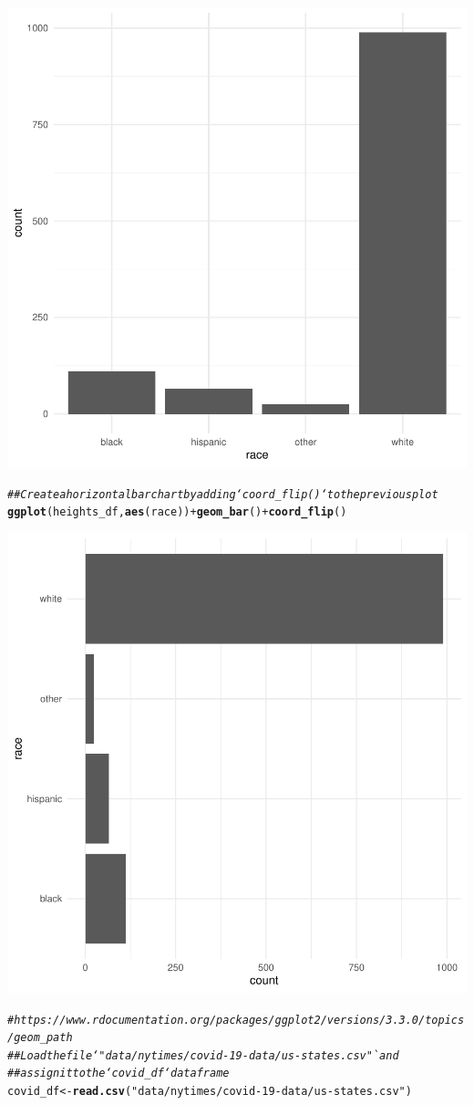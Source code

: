 \documentclass{article}\usepackage[]{graphicx}\usepackage[]{xcolor}
\makeatletter
\newcommand{\hlstr}[1]{\textcolor[rgb]{0.192,0.494,0.8}{#1}}%
\newcommand{\hlcom}[1]{\textcolor[rgb]{0.678,0.584,0.686}{\textit{#1}}}%
\newcommand{\hlopt}[1]{\textcolor[rgb]{0,0,0}{#1}}%
\newcommand{\hlstd}[1]{\textcolor[rgb]{0.345,0.345,0.345}{#1}}%
\newcommand{\hlkwb}[1]{\textcolor[rgb]{0.69,0.353,0.396}{#1}}%
\newcommand{\hlkwd}[1]{\textcolor[rgb]{0.737,0.353,0.396}{\textbf{#1}}}%
\newenvironment{kframe}{%
 \def\at@end@of@kframe{}%
 \ifinner\ifhmode%
  \def\at@end@of@kframe{\end{minipage}}%
  \begin{minipage}{\columnwidth}%
 \fi\fi%
 \def\FrameCommand##1{\hskip\@totalleftmargin \hskip-\fboxsep
 \colorbox{shadecolor}{##1}\hskip-\fboxsep
     \hskip-\linewidth \hskip-\@totalleftmargin \hskip\columnwidth}%
 \MakeFramed {\advance\hsize-\width
   \@totalleftmargin\z@ \linewidth\hsize
   \@setminipage}}%
 {\par\unskip\endMakeFramed%
 \at@end@of@kframe}
\newenvironment{knitrout}{}{} %
\makeatother
\begin{document}
\begin{knitrout}
{\centering \includegraphics[width=.6\linewidth]{figure/assignment-06-ReppetoBrian-Rnwauto-report-4} 

}


\begin{kframe}\begin{alltt}
\hlcom{## Create a horizontal bar chart by adding `coord_flip()` to the previous plot}
\hlkwd{ggplot}\hlstd{(heights_df,} \hlkwd{aes}\hlstd{(race))} \hlopt{+} \hlkwd{geom_bar}\hlstd{()} \hlopt{+} \hlkwd{coord_flip}\hlstd{()}
\end{alltt}
\end{kframe}

{\centering \includegraphics[width=.6\linewidth]{figure/assignment-06-ReppetoBrian-Rnwauto-report-5} 

}


\begin{kframe}\begin{alltt}
\hlcom{# https://www.rdocumentation.org/packages/ggplot2/versions/3.3.0/topics/geom_path}
\hlcom{## Load the file `"data/nytimes/covid-19-data/us-states.csv"` and}
\hlcom{## assign it to the `covid_df` dataframe}
\hlstd{covid_df} \hlkwb{<-} \hlkwd{read.csv}\hlstd{(}\hlstr{"data/nytimes/covid-19-data/us-states.csv"}\hlstd{)}


\end{alltt}
\end{kframe}
\end{knitrout}
\end{document}
